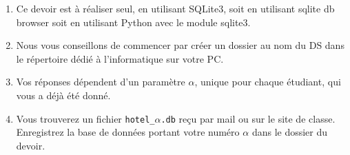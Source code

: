 
\begin{enumerate}
\item Ce devoir est à réaliser seul, en utilisant SQLite3, soit en utilisant sqlite db browser soit en utilisant Python avec le module sqlite3.
\item Nous vous conseillons de commencer par créer un dossier au nom du DS dans le répertoire dédié à l'informatique sur votre PC. 



\item Vos réponses dépendent d'un paramètre $\alpha$, unique pour chaque étudiant, qui vous a déjà été donné.



\item Vous trouverez un fichier \texttt{hotel\_}$\alpha$\texttt{.db} reçu par mail ou sur le site de classe.
Enregistrez la base de données portant votre numéro $\alpha$ dans le dossier du devoir. 

%
%




\end{enumerate}
